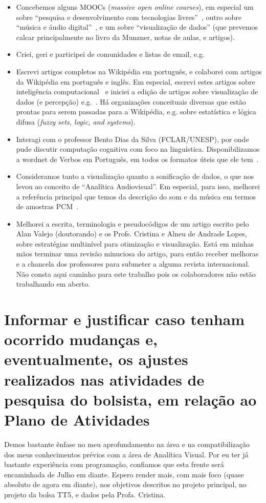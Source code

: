 \documentclass[a4paper, 11pt]{article}
\begin{document}
\begin{itemize}
  \item Concebemos alguns MOOCs (\emph{massive open online courses}), em especial um sobre ``pesquisa e desenvolvimento com tecnologias livres''~\cite{tecl}, outro sobre ``música e áudio digital''~\cite{mus}, e um sobre ``visualização de dados'' (que prevemos calcar principalmente no livro da Munzner, notas de aulas, e artigos).
  \item Criei, geri e participei de comunidades e listas de email, e.g.~\cite{vimUse,fvim,fpln,fic,frc}
  \item Escrevi artigos completos na Wikipédia em português, e colaborei com artigos da Wikipédia em português e inglês. Em especial, escrevi estes artigos sobre inteligência computacional~\cite{wic,wsd,wib,wpe,wpo,wed,wsi,wcc,wce} e iniciei a edição de artigos sobre visualização de dados (e percepção) e.g.~\cite{wvd}. Há organizações conceituais diversas que estão prontas para serem passadas para a Wikipédia, e.g. sobre estatística e lógica difusa (\emph{fuzzy sets, logic, and systems}).
  \item Interagi com o professor Bento Dias da Silva (FCLAR/UNESP), por onde pude discutir computação cognitiva com foco na linguística. Disponibilizamos a wordnet de Verbos em Português, em todos os formatos úteis que ele tem~\cite{bento}.
  \item Consideramos tanto a visualização quanto a sonificação de dados, o que nos levou ao conceito de ``Analítica Audiovisual''. Em especial, para isso, melhorei a referência principal que temos da descrição do som e da música em termos de amostras PCM~\cite{arxiv}.
  \item Melhorei a escrita, terminologia e pseudocódigos de um artigo escrito pelo Alan Valejo (doutorando) e os Profs. Cristina e Alneu de Andrade Lopes, sobre estratégias multinível para otimização e visualização. Está em minhas mãos terminar uma revisão minuciosa do artigo, para então receber melhoras e a chancela dos professores para submeter a alguma revista internacional. Não consta aqui caminho para este trabalho pois os colaboradores não estão trabalhando em aberto.
\end{itemize}

\section{Informar e justificar caso tenham ocorrido mudanças e, eventualmente, os ajustes realizados nas atividades de pesquisa do bolsista, em relação ao Plano de Atividades}
Demos bastante ênfase no meu aprofundamento na área e na compatibilização dos meus conhecimentos prévios com a área de Analítica Visual.
Por eu ter já bastante experiência com programação, confiamos que esta frente será encaminhada de Julho em diante.
Espero render mais, com mais foco (quase absoluto de agora em diante), nos objetivos descritos no projeto principal,
no projeto da bolsa TT5, e dados pela Profa. Cristina.
\end{document}
